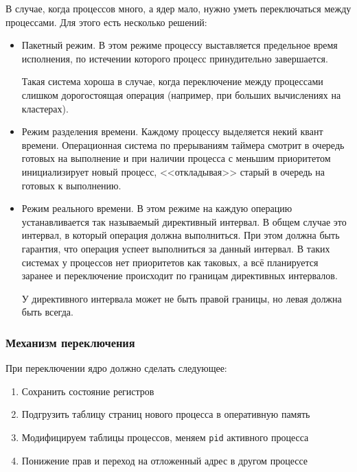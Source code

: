 В случае, когда процессов много, а ядер мало, нужно уметь переключаться между процессами. Для этого есть несколько решений:
\begin{itemize}
\item Пакетный режим. В этом режиме процессу выставляется предельное время исполнения, по истечении которого процесс принудительно завершается. 

Такая система хороша в случае, когда переключение между процессами слишком дорогостоящая операция (например, при больших вычислениях на кластерах).

\item Режим разделения времени. Каждому процессу выделяется некий квант времени. Операционная система по прерываниям таймера смотрит в очередь готовых на выполнение и при наличии процесса с меньшим приоритетом инициализирует новый процесс, <<откладывая>> старый в очередь на готовых к выполнению.

\item Режим реального времени. В этом режиме на каждую операцию устанавливается так называемый директивный интервал. В общем случае это интервал, в который операция должна выполниться. При этом должна быть гарантия, что операция успеет выполниться за данный интервал. В таких системах у процессов нет приоритетов как таковых,  а всё планируется заранее и переключение происходит по границам директивных интервалов.

У директивного интервала может не быть правой границы, но левая должна быть всегда.
\end{itemize}







\subsubsection{Механизм переключения}

При переключении ядро должно сделать следующее:
\begin{enumerate}
\item Сохранить состояние регистров
\item Подгрузить таблицу страниц нового процесса в оперативную память
\item Модифицируем таблицы процессов, меняем \verb!pid! активного процесса
\item Понижение прав и переход на отложенный адрес в другом процессе
\end{enumerate}











